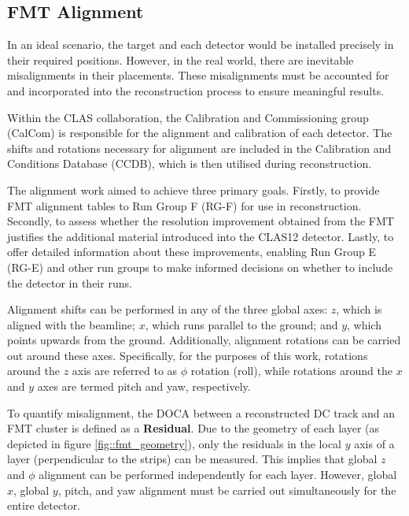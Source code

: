 \subsection{FMT Alignment}
\label{ssec::fmt_alignment}
    In an ideal scenario, the target and each detector would be installed precisely in their required positions.
    However, in the real world, there are inevitable misalignments in their placements.
    These misalignments must be accounted for and incorporated into the reconstruction process to ensure meaningful results.

    Within the CLAS collaboration, the Calibration and Commissioning group (CalCom) is responsible for the alignment and calibration of each detector.
    The shifts and rotations necessary for alignment are included in the Calibration and Conditions Database (CCDB), which is then utilised during reconstruction.

    The alignment work aimed to achieve three primary goals.
    Firstly, to provide FMT alignment tables to Run Group F (RG-F) for use in reconstruction.
    Secondly, to assess whether the resolution improvement obtained from the FMT justifies the additional material introduced into the CLAS12 detector.
    Lastly, to offer detailed information about these improvements, enabling Run Group E (RG-E) and other run groups to make informed decisions on whether to include the detector in their runs.

    Alignment shifts can be performed in any of the three global axes: $z$, which is aligned with the beamline; $x$, which runs parallel to the ground; and $y$, which points upwards from the ground.
    Additionally, alignment rotations can be carried out around these axes.
    Specifically, for the purposes of this work, rotations around the $z$ axis are referred to as $\phi$ rotation (roll), while rotations around the $x$ and $y$ axes are termed pitch and yaw, respectively.

    To quantify misalignment, the DOCA between a reconstructed DC track and an FMT cluster is defined as a \textbf{Residual}.
    Due to the geometry of each layer (as depicted in figure \ref{fig::fmt_geometry}), only the residuals in the local $y$ axis of a layer (perpendicular to the strips) can be measured.
    This implies that global $z$ and $\phi$ alignment can be performed independently for each layer.
    However, global $x$, global $y$, pitch, and yaw alignment must be carried out simultaneously for the entire detector.

